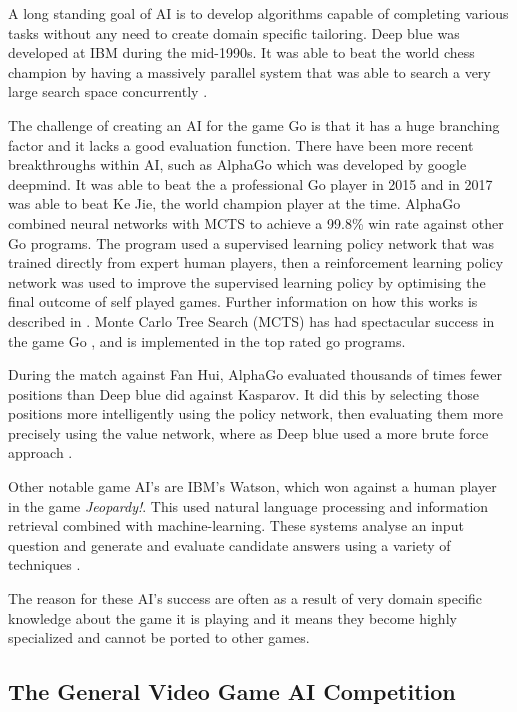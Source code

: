 \documentclass[journal]{IEEEtran}
\begin{document}
		A long standing goal of AI is to develop algorithms capable of completing various tasks without any need to create domain specific tailoring.
		Deep blue was developed at IBM during the mid-1990s. It was able to beat the world chess champion by having a massively parallel system that was able to search a very large search space concurrently \cite{DeepBlue}.

		The challenge of creating an AI for the game Go is that it has a huge branching factor and it lacks a good evaluation function.
		There have been more recent breakthroughs within AI, such as AlphaGo \cite{silver2016mastering} which was developed by google deepmind. It was able to beat the a professional Go player in 2015 and in 2017 was able to beat Ke Jie, the world champion player at the time\cite{silver2016mastering}.
		AlphaGo combined neural networks with MCTS to achieve a 99.8\% win rate against other Go programs. The program used a supervised learning policy network that was trained directly from expert human players, then a reinforcement learning policy network was used to improve the supervised learning policy by optimising the final outcome of self played games. Further information on how this works is described in \cite{silver2016mastering}.
		Monte Carlo Tree Search (MCTS) has had spectacular success in the game Go \cite{browne2012survey}, and is implemented in the top rated go programs.

		During the match against Fan Hui, AlphaGo evaluated thousands of times fewer positions than Deep blue did against Kasparov. It did this by selecting those positions more intelligently using the policy network, then evaluating them more precisely using the value network, where as Deep blue used a more brute force approach \cite{silver2016mastering, DeepBlue}.
		
		Other notable game AI's are IBM's Watson, which won against a human player in the game \textit{Jeopardy!}. This used natural language processing and information retrieval combined with machine-learning. These systems analyse an input question and generate and evaluate candidate answers using a variety of techniques \cite{ferrucci2013watson}.

		The reason for these AI's success are often as a result of very domain specific knowledge about the game it is playing and it means they become highly specialized and cannot be ported to other games.
		

	\subsection{The General Video Game AI Competition}
	
\end{document}
